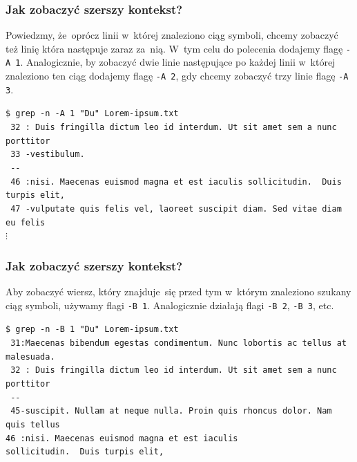 \documentclass[10pt,t]{beamer}
\begin{document}
\begin{frame}
  \frametitle{Jak zobaczyć szerszy kontekst?}


  Powiedzmy, że~oprócz linii w~której znaleziono ciąg symboli, chcemy
  zobaczyć też linię która następuje zaraz za~nią. W~tym celu do polecenia
  dodajemy flagę \texttt{-A 1}. Analogicznie, by zobaczyć dwie linie
  następujące po każdej linii w~której znaleziono ten ciąg dodajemy
  flagę \texttt{-A 2}, gdy chcemy zobaczyć trzy linie flagę
  \texttt{-A 3}.

  \texttt{\$ grep -n -A 1 "Du"{} Lorem-ipsum.txt} \\
  \texttt{{\color{green} 32}{\color{jAxisBlue} :}{\color{red} Du}is
    fringilla dictum leo id interdum. Ut sit amet sem a nunc porttitor} \\
  \texttt{{\color{green} 33}{\color{jAxisBlue} -}vestibulum.} \\
  \texttt{{\color{jAxisBlue} -{}-}} \\
  \texttt{{\color{green} 46}{\color{jAxisBlue} :}nisi. Maecenas euismod
    magna et est iaculis sollicitudin. {\color{red} Du}is turpis elit,} \\
  \texttt{{\color{green} 47}{\color{jAxisBlue} -}vulputate quis felis vel,
    laoreet suscipit diam. Sed vitae diam eu felis} \\
  \hspace{1em} $\vdots$

\end{frame}





\begin{frame}
  \frametitle{Jak zobaczyć szerszy kontekst?}


  Aby zobaczyć wiersz, który znajduje~się przed tym w~którym znaleziono
  szukany ciąg symboli, używamy flagi \texttt{-B 1}. Analogicznie działają
  flagi \texttt{-B 2}, \texttt{-B 3}, etc.

  \texttt{\$ grep -n -B 1 "Du"{} Lorem-ipsum.txt} \\
  \texttt{{\color{green} 31}{\color{jAxisBlue}:}Maecenas bibendum egestas
    condimentum. Nunc lobortis ac tellus at malesuada.} \\
  \texttt{{\color{green} 32}{\color{jAxisBlue} :}{\color{red} Du}is
    fringilla dictum leo id interdum. Ut sit amet sem a nunc porttitor} \\
  \texttt{{\color{jAxisBlue} -{}-}} \\
  \texttt{{\color{green} 45}{\color{jAxisBlue}-}suscipit. Nullam at neque
    nulla. Proin quis rhoncus dolor. Nam quis tellus} \\
  \texttt{{\color{green}46}{\color{jAxisBlue} :}nisi. Maecenas euismod
    magna et est iaculis} \\
  \texttt{sollicitudin. {\color{red} Du}is turpis elit,}

\end{frame}
\end{document}
